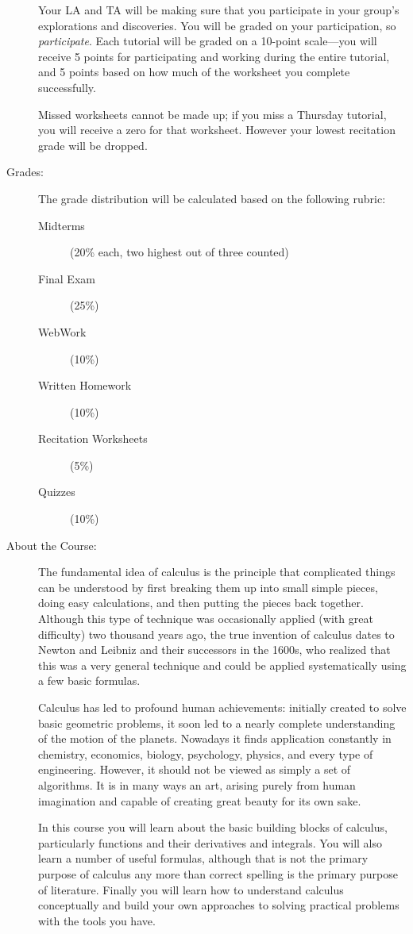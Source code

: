 \documentclass[11pt]{article}
\begin{document}
\begin{description}
  Your LA and TA will be making sure that you participate in your
  group's explorations and discoveries.  You will be graded on your
  participation, so {\it participate}.  Each tutorial will be graded
  on a 10-point scale---you will receive 5 points for participating
  and working during the entire tutorial, and 5 points based on how
  much of the worksheet you complete successfully.

  Missed worksheets cannot be made up; if you miss a Thursday
  tutorial, you will receive a zero for that worksheet. However your
  lowest recitation grade will be dropped.

\item[Grades:] The grade distribution will be calculated based on the
  following rubric:
  \begin{description}
  \item[Midterms] (20\% each, two highest out of three counted)
  \item[Final Exam] (25\%)
  \item[WebWork] (10\%)
  \item[Written Homework] (10\%)
  \item[Recitation Worksheets] (5\%)
  \item[Quizzes] (10\%)
  \end{description}

\item[About the Course:] The fundamental idea of calculus is the
  principle that complicated things can be understood by first
  breaking them up into small simple pieces, doing easy calculations,
  and then putting the pieces back together. Although this type of
  technique was occasionally applied (with great difficulty) two
  thousand years ago, the true invention of calculus dates to Newton
  and Leibniz and their successors in the 1600s, who realized that
  this was a very general technique and could be applied
  systematically using a few basic formulas.

  Calculus has led to profound human achievements: initially created
  to solve basic geometric problems, it soon led to a nearly complete
  understanding of the motion of the planets. Nowadays it finds
  application constantly in chemistry, economics, biology, psychology,
  physics, and every type of engineering.  However, it should not be
  viewed as simply a set of algorithms. It is in many ways an art,
  arising purely from human imagination and capable of creating great
  beauty for its own sake.

  In this course you will learn about the basic building blocks of
  calculus, particularly functions and their derivatives and
  integrals. You will also learn a number of useful formulas, although
  that is not the primary purpose of calculus any more than correct
  spelling is the primary purpose of literature. Finally you will
  learn how to understand calculus conceptually and build your own
  approaches to solving practical problems with the tools you have.


\end{description}
\end{document}
